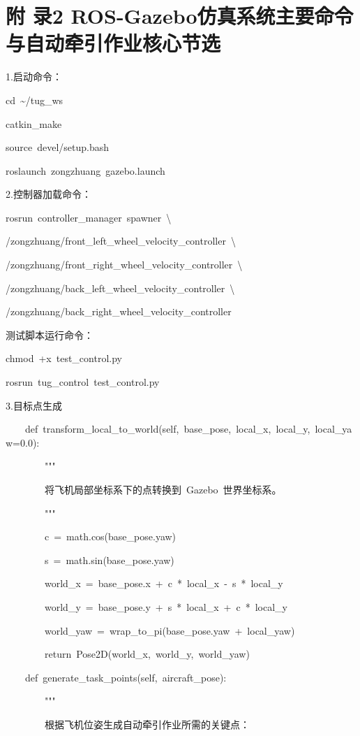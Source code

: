\section*{附 录2 ROS-Gazebo仿真系统主要命令与自动牵引作业核心节选}

1.启动命令：

cd~\textasciitilde/tug\_ws

catkin\_make

source~devel/setup.bash

roslaunch~zongzhuang~gazebo.launch

2.控制器加载命令：

rosrun~controller\_manager~spawner~\textbackslash{}

/zongzhuang/front\_left\_wheel\_velocity\_controller~\textbackslash{}

/zongzhuang/front\_right\_wheel\_velocity\_controller~\textbackslash{}

/zongzhuang/back\_left\_wheel\_velocity\_controller~\textbackslash{}

/zongzhuang/back\_right\_wheel\_velocity\_controller

测试脚本运行命令：

chmod~+x~test\_control.py

rosrun~tug\_control~test\_control.py

3.目标点生成

~~~~def~transform\_local\_to\_world(self,~base\_pose,~local\_x,~local\_y,~local\_yaw=0.0):

~~~~~~~~"""

~~~~~~~~将飞机局部坐标系下的点转换到~Gazebo~世界坐标系。

~~~~~~~~"""

~~~~~~~~c~=~math.cos(base\_pose.yaw)

~~~~~~~~s~=~math.sin(base\_pose.yaw)

~~~~~~~~world\_x~=~base\_pose.x~+~c~*~local\_x~-~s~*~local\_y

~~~~~~~~world\_y~=~base\_pose.y~+~s~*~local\_x~+~c~*~local\_y

~~~~~~~~world\_yaw~=~wrap\_to\_pi(base\_pose.yaw~+~local\_yaw)

~~~~~~~~return~Pose2D(world\_x,~world\_y,~world\_yaw)

~~~~def~generate\_task\_points(self,~aircraft\_pose):

~~~~~~~~"""

~~~~~~~~根据飞机位姿生成自动牵引作业所需的关键点：

